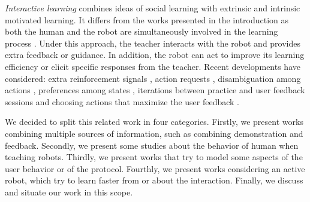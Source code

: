 
\emph{Interactive learning} combines ideas of social learning with extrinsic and intrinsic motivated learning. It differs from the works presented in the introduction as both the human and the robot are simultaneously involved in the learning process \cite{kaplan2002robotic,nicolescu2003natural,breazeal2004tutelage,thomaz2008teachable}. Under this approach, the teacher interacts with the robot and provides extra feedback or guidance. In addition, the robot can act to improve its learning efficiency or elicit specific responses from the teacher. Recent developments have considered: extra reinforcement signals \cite{thomaz2008teachable}, action requests \cite{macl09airl}, disambiguation among actions \cite{chernova09jair}, preferences among states \cite{Mason2011}, iterations between practice and user feedback sessions \cite{judah2010reinforcement} and choosing actions that maximize the user feedback \cite{knox2009interactively}.

We decided to split this related work in four categories. Firstly, we present works combining multiple sources of information, such as combining demonstration and feedback. Secondly, we present some studies about the behavior of human when teaching robots. Thirdly, we present works that try to model some aspects of the user behavior or of the protocol. Fourthly, we present works considering an active robot, which try to learn faster from or about the interaction. Finally, we discuss and situate our work in this scope.


